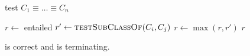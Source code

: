 \documentclass[paper.tex]{subfiles}
\begin{document}
\begin{algorithm}[H]
  \caption{test $C_1 \equiv \ldots \equiv C_n$}
  \begin{algorithmic}[1]
    \raggedright
      \State $r \gets$ entailed
          \State $r' \gets \Call{testSubClassOf}{C_i, C_j}$
          \label{alg:testEquivalentClasses:inner}
          \State $r \gets \max(r, r')$
        \EndFor
      \EndFor
      \State \Return $r$
    \EndFunction
  \end{algorithmic}
\end{algorithm}

\begin{theorem}
   is correct and is terminating.
\end{theorem}
\end{document}
